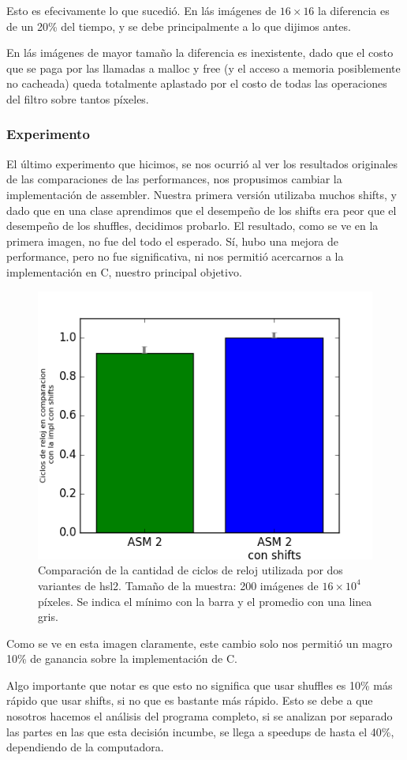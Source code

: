 Esto es efecivamente lo que sucedió. En lás imágenes de $16 \times 16$ la diferencia es de un 20\% del tiempo, y se debe principalmente a lo que dijimos antes.

En lás imágenes de mayor tamaño la diferencia es inexistente, dado que el costo que se paga por las llamadas a malloc y free (y el acceso a memoria posiblemente no cacheada) queda totalmente aplastado por el costo de todas las operaciones del filtro sobre tantos píxeles.


\subsubsection*{Experimento}
El último experimento que hicimos, se nos ocurrió al ver los resultados originales de las comparaciones de las performances, nos propusimos cambiar la implementación de assembler. Nuestra primera versión utilizaba muchos shifts, y dado que en una clase aprendimos que el desempeño de los shifts era peor que el desempeño de los shuffles, decidimos probarlo. El resultado, como se ve en la primera imagen, no fue del todo el esperado. Sí, hubo una mejora de performance, pero no fue significativa, ni nos permitió acercarnos a la implementación en C, nuestro principal objetivo.


\begin{figure}[H] 
	\centering
  \includegraphics[scale=0.7]{images/hsl-shsh.png}
  \caption{Comparación de la cantidad de ciclos de reloj utilizada por dos variantes de hsl2. Tamaño de la muestra: 200 imágenes de $16 \times 10^4$ píxeles. Se indica el mínimo con la barra y el promedio con una linea gris.}
\end{figure}

Como se ve en esta imagen claramente, este cambio solo nos permitió un magro 10\% de ganancia sobre la implementación de C.

Algo importante que notar es que esto no significa que usar shuffles es 10\% más rápido que usar shifts, si no que es bastante más rápido. Esto se debe a que nosotros hacemos el análisis del programa completo, si se analizan por separado las partes en las que esta decisión incumbe, se llega a speedups de hasta el 40\%, dependiendo de la computadora.
\\




